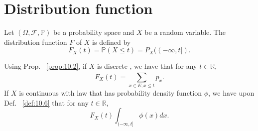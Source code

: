 \section{Distribution function}%
\label{sec:Distribution function}

\begin{definition}[]
    \label{def:10.10}
    Let $(\Omega, \mathcal{F}, \mathbb{P})$ be a probability space and $X$ be a random variable. The distribution
    function $F$ of $X$ is defined by
    \[
        F_X(t) = \mathbb{P}(X \le t) = P_X((-\infty, t])
    .\] 
    
    \begin{remark}[]
        \label{rem:10.7}
        Using Prop. ~\ref{prop:10.2}, if $X$ is discrete , we have that for any $t \in \mathbb{R}$,
        \[
        F_X(t)=\sum_{x\in E, x\le t}^{ } p_x
        .\] 
        If $X$ is continuous with law that has probability density function $\phi$, we have upon Def.
        ~\ref{def:10.6} that for any $t \in \mathbb{R}$,
        \[
            F_X(t) \int_{(-\infty, t]} \phi(x)dx
        .\] 
    \end{remark}
\end{definition}




